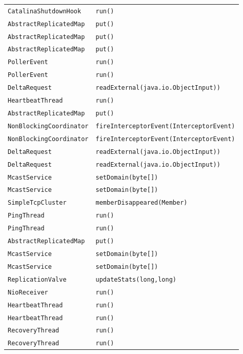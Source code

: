 \begin{center}
\begin{longtable}{ll}
\lstinline/CatalinaShutdownHook/&{\lstinline/run()/}\\
\lstinline/AbstractReplicatedMap/&{\lstinline/put()/}\\
\lstinline/AbstractReplicatedMap/&{\lstinline/put()/}\\
\lstinline/AbstractReplicatedMap/&{\lstinline/put()/}\\
\lstinline/PollerEvent/&{\lstinline/run()/}\\
\lstinline/PollerEvent/&{\lstinline/run()/}\\
\lstinline/DeltaRequest/&{\lstinline/readExternal(java.io.ObjectInput))/}\\
\lstinline/HeartbeatThread/&{\lstinline/run()/}\\
\lstinline/AbstractReplicatedMap/&{\lstinline/put()/}\\
\lstinline/NonBlockingCoordinator/&{\lstinline/fireInterceptorEvent(InterceptorEvent)/}\\
\lstinline/NonBlockingCoordinator/&{\lstinline/fireInterceptorEvent(InterceptorEvent)/}\\
\lstinline/DeltaRequest/&{\lstinline/readExternal(java.io.ObjectInput))/}\\
\lstinline/DeltaRequest/&{\lstinline/readExternal(java.io.ObjectInput))/}\\
\lstinline/McastService/&{\lstinline/setDomain(byte[])/}\\
\lstinline/McastService/&{\lstinline/setDomain(byte[])/}\\
\lstinline/SimpleTcpCluster/&{\lstinline/memberDisappeared(Member)/}\\
\lstinline/PingThread/&{\lstinline/run()/}\\
\lstinline/PingThread/&{\lstinline/run()/}\\
\lstinline/AbstractReplicatedMap/&{\lstinline/put()/}\\
\lstinline/McastService/&{\lstinline/setDomain(byte[])/}\\
\lstinline/McastService/&{\lstinline/setDomain(byte[])/}\\
\lstinline/ReplicationValve/&{\lstinline/updateStats(long,long)/}\\
\lstinline/NioReceiver/&{\lstinline/run()/}\\
\lstinline/HeartbeatThread/&{\lstinline/run()/}\\
\lstinline/HeartbeatThread/&{\lstinline/run()/}\\
\lstinline/RecoveryThread/&{\lstinline/run()/}\\
\lstinline/RecoveryThread/&{\lstinline/run()/}\\

\end{longtable}
\end{center}
